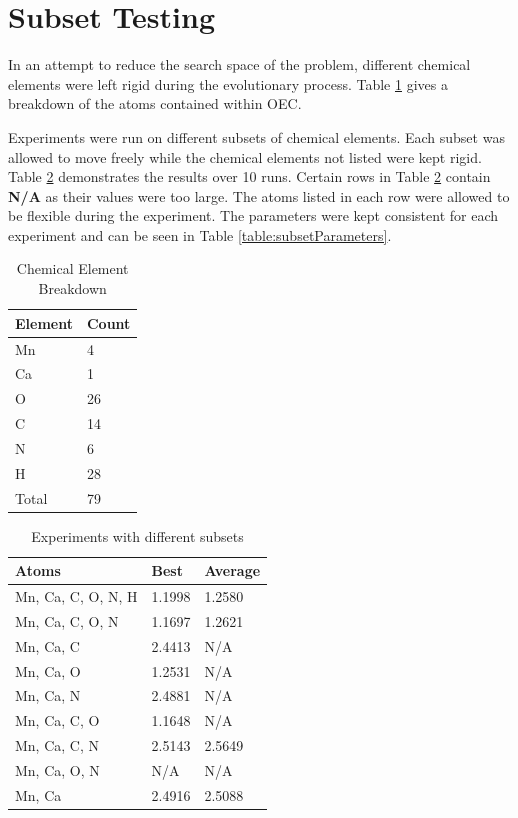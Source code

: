 \documentclass[conference]{IEEEtran}
\begin{document}
\section{Subset Testing}
\label{sec:subsetTesting}

In an attempt to reduce the search space of the problem, different chemical elements were left rigid during the evolutionary process. Table \ref{table:elementBreakdown} gives a breakdown of the atoms contained within OEC.

Experiments were run on different subsets of chemical elements. Each subset was allowed to move freely while the chemical elements not listed were kept rigid. Table \ref{table:subsetResults} demonstrates the results over 10 runs. Certain rows in Table \ref{table:subsetResults} contain \textbf{N/A} as their values were too large. The atoms listed in each row were allowed to be flexible during the experiment. The parameters were kept consistent for each experiment and can be seen in Table \ref{table:subsetParameters}.

\begin{table}
\caption{Chemical Element Breakdown}
\label{table:elementBreakdown}
\centering
\normalsize
\begin{tabular}{ | l | l | }
  \hline
    Element & Count \\ \hline
    Mn & 4 \\ \hline
    Ca & 1 \\ \hline
    O & 26 \\ \hline
    C & 14 \\ \hline
    N & 6 \\ \hline
    H & 28 \\ \hline
    Total & 79 \\ \hline
\end{tabular}
\end{table}

\begin{table}
  \caption{Experiments with different subsets}
  \label{table:subsetResults}
  \centering
  \normalsize
  \begin{tabular}{ | l | l | l | }
    \hline
    Atoms & Best & Average \\ \hline \hline
    Mn, Ca, C, O, N, H & 1.1998 & 1.2580 \\ \hline
    Mn, Ca, C, O, N & 1.1697 & 1.2621 \\ \hline
    Mn, Ca, C & 2.4413 & N/A \\ \hline
    Mn, Ca, O & 1.2531 & N/A \\ \hline
    Mn, Ca, N & 2.4881 & N/A \\ \hline
    Mn, Ca, C, O & 1.1648 & N/A \\ \hline
    Mn, Ca, C, N & 2.5143 & 2.5649 \\ \hline
    Mn, Ca, O, N & N/A & N/A \\ \hline
    Mn, Ca & 2.4916 & 2.5088 \\ \hline
  \end{tabular}
\end{table}
\end{document}
